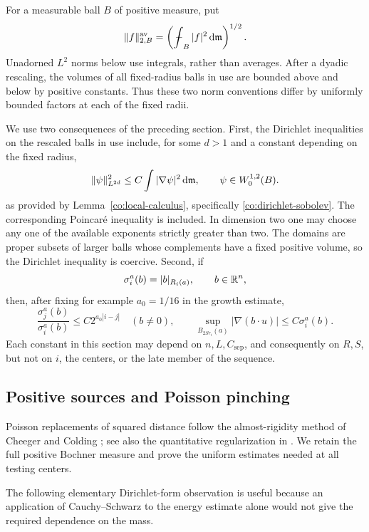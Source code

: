 For a measurable ball $B$ of positive measure, put
\[
 \|f\|_{2,B}^{\mathrm{av}}
 =\left(\fint_B |f|^2\dd\m\right)^{1/2}.
\]
Unadorned $L^2$ norms below use integrals, rather than averages.
After a dyadic rescaling, the volumes of all fixed-radius balls in
use are bounded above and below by positive constants.  Thus these
two norm conventions differ by uniformly bounded factors at each of
the fixed radii.

We use two consequences of the preceding section.  First, the
Dirichlet inequalities on the rescaled balls in use include, for
some $d>1$ and a constant depending on the fixed radius,
\begin{equation}
 \|\psi\|_{L^{2d}}^2\le C\int |\nabla\psi|^2\,\mathrm d\mathfrak m,
 \qquad \psi\in W^{1,2}_0(B).
 \label{pi:dirichlet-sobolev}
\end{equation}
as provided by Lemma~\ref{co:local-calculus}, specifically
\eqref{co:dirichlet-sobolev}.
The corresponding Poincar\'e inequality is included.  In dimension
two one may choose any one of the available exponents strictly
greater than two.  The domains are proper subsets of larger balls
whose complements have a fixed positive volume, so the Dirichlet
inequality is coercive.  Second, if
\[
 \sigma_i^a(b)=|b|_{R_i(a)},\qquad b\in\mathbb R^n,
\]
then, after fixing for example $a_0=1/16$ in the growth estimate,
\begin{equation}
 \frac{\sigma_j^a(b)}{\sigma_i^a(b)}
 \le C2^{a_0|i-j|}\quad(b\ne0),\qquad
 \sup_{B_{2Sr_i}(a)}|\nabla(b\cdot u)|
 \le C\sigma_i^a(b).
 \label{pi:coordinate-input}
\end{equation}
Each constant in this section may depend on $n,L,C_{\mathrm{sep}}$, and consequently
on $R,S$, but not on $i$, the centers, or the late member of the sequence.

\subsection{Positive sources and Poisson pinching}

Poisson replacements of squared distance follow the almost-rigidity
method of Cheeger and Colding \cite{CC96}; see also the quantitative
regularization in \cite[Section~6.1]{CJN21}. We retain the full
positive Bochner measure and prove the uniform estimates needed at
all testing centers.

The following elementary Dirichlet-form observation is useful because
an application of Cauchy--Schwarz to the energy estimate alone would
not give the required dependence on the mass.

